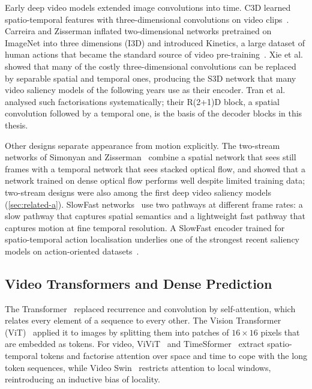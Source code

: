 Early deep video models extended image convolutions into time. C3D learned
spatio-temporal features with three-dimensional convolutions on video
clips~\cite{tran2015learning}. Carreira and Zisserman inflated two-dimensional
networks pretrained on ImageNet into three dimensions (I3D) and introduced
Kinetics, a large dataset of human actions that became the standard source of
video pre-training~\cite{carreira2017quo}. Xie et al.~\cite{xie2018rethinking}
showed that many of the costly three-dimensional convolutions can be replaced
by separable spatial and temporal ones, producing the S3D network that many
video saliency models of the following years use as their encoder. Tran et
al.~\cite{tran2018closer} analysed such factorisations systematically; their
R(2+1)D block, a spatial convolution followed by a temporal one, is the basis of
the decoder blocks in this thesis.

Other designs separate appearance from motion explicitly. The two-stream
networks of Simonyan and Zisserman~\cite{simonyan2014two} combine a spatial
network that sees still frames with a temporal network that sees stacked optical
flow, and showed that a network trained on dense optical flow performs well
despite limited training data; two-stream designs were also among the first deep
video saliency models (\cref{sec:related-a}). SlowFast
networks~\cite{feichtenhofer2019slowfast} use two pathways at different frame
rates: a slow pathway that captures spatial semantics and a lightweight fast
pathway that captures motion at fine temporal resolution. A SlowFast encoder
trained for spatio-temporal action localisation underlies one of the strongest
recent saliency models on action-oriented datasets~\cite{girmaji2025minimalistic}.

\subsection{Video Transformers and Dense Prediction}

The Transformer~\cite{vaswani2017attention} replaced recurrence and convolution
by self-attention, which relates every element of a sequence to every other. The
Vision Transformer (\acrshort{ViT})~\cite{dosovitskiy2021image} applied it to images by
splitting them into patches of $16\times16$ pixels that are embedded as tokens.
For video, ViViT~\cite{arnab2021vivit} and TimeSformer~\cite{bertasius2021space}
extract spatio-temporal tokens and factorise attention over space and time to
cope with the long token sequences, while Video Swin~\cite{liu2022video}
restricts attention to local windows, reintroducing an inductive bias of
locality.

